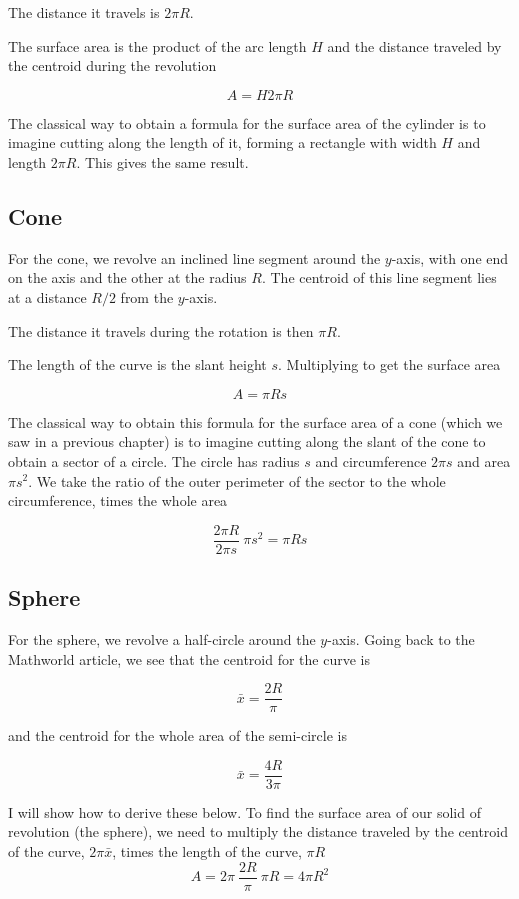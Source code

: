 \documentclass[11pt, oneside]{article}   	%
\begin{document}
The distance it travels is $2\pi R$.

The surface area is the product of the arc length $H$ and the distance traveled by the centroid during the revolution

\[A = H 2 \pi R \]

The classical way to obtain a formula for the surface area of the cylinder is to imagine cutting along the length of it, forming a rectangle with width $H$ and length $2 \pi R$.  This gives the same result.

\subsection*{Cone}

For the cone, we revolve an inclined line segment around the $y$-axis, with one end on the axis and the other at the radius $R$.  The centroid of this line segment lies at a distance $R/2$ from the $y$-axis.  

The distance it travels during the rotation is then $\pi R$.

The length of the curve is the slant height $s$.  Multiplying to get the surface area

\[ A = \pi R s \]

The classical way to obtain this formula for the surface area of a cone (which we saw in a previous chapter) is to imagine cutting along the slant of the cone to obtain a sector of a circle.  The circle has radius $s$ and circumference $2 \pi s$ and area $\pi s^2$.  We take the ratio of the outer perimeter of the sector to the whole circumference, times the whole area

\[ \frac{2 \pi R}{2 \pi s} \ \pi s^2 = \pi R s \]

\subsection*{Sphere}

For the sphere, we revolve a half-circle around the $y$-axis.  Going back to the Mathworld article, we see that the centroid for the curve is

\[ \bar{x} = \frac{2 R}{\pi} \] 

and the centroid for the whole area of the semi-circle is

\[ \bar{x} = \frac{4 R}{3 \pi} \]

I will show how to derive these below.  To find the surface area of our solid of revolution (the sphere), we need to multiply the distance traveled by the centroid of the curve, $2 \pi \bar{x}$, times the length of the curve, $\pi R$
\[ A = 2 \pi \ \frac{2 R}{\pi} \ \pi R = 4 \pi R^2 \]
\end{document}
